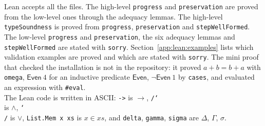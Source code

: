 Lean accepts all the files.
The high-level \texttt{progress} and \texttt{preservation} are proved from the low-level ones through the adequacy lemmas.
The high-level \texttt{typeSoundness} is proved from \texttt{progress}, \texttt{preservation} and \texttt{stepWellFormed}.
The low-level \texttt{progress} and \texttt{preservation}, the six adequacy lemmas and \texttt{stepWellFormed} are stated with \texttt{sorry}.
Section~\ref{app:lean:examples} lists which validation examples are proved and which are stated with \texttt{sorry}.
The mini proof that checked the installation is not in the repository:
it proved $a+b=b+a$ with \texttt{omega}, $\mathsf{Even}\ 4$ for an inductive predicate $\mathsf{Even}$, $\neg\mathsf{Even}\ 1$ by \texttt{cases}, and evaluated an expression with \texttt{\#eval}.
\\[1ex]
The Lean code is written in ASCII:
\texttt{->} is $\rightarrow$, \texttt{/\char`\\} is $\wedge$, \texttt{\char`\\/} is $\vee$, \texttt{List.Mem x xs} is $x\in xs$, and \texttt{delta}, \texttt{gamma}, \texttt{sigma} are $\Delta$, $\Gamma$, $\sigma$.

